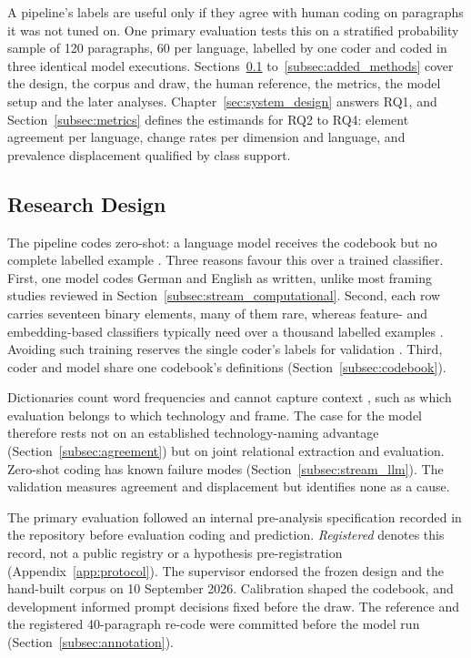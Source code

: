 A pipeline's labels are useful only if they agree with human coding on paragraphs it was not tuned on. One primary evaluation tests this on a stratified probability sample of 120 paragraphs, 60 per language, labelled by one coder and coded in three identical model executions. Sections~\ref{subsec:research_design} to~\ref{subsec:added_methods} cover the design, the corpus and draw, the human reference, the metrics, the model setup and the later analyses. Chapter~\ref{sec:system_design} answers RQ1, and Section~\ref{subsec:metrics} defines the estimands for RQ2 to RQ4: element agreement per language, change rates per dimension and language, and prevalence displacement qualified by class support.

\subsection{Research Design}\label{subsec:research_design}

The pipeline codes zero-shot: a language model receives the codebook but no complete labelled example \parencite[p.~104]{feuerriegel2025nlptextdata}. Three reasons favour this over a trained classifier. First, one model codes German and English as written, unlike most framing studies reviewed in Section~\ref{subsec:stream_computational}. Second, each row carries seventeen binary elements, many of them rare, whereas feature- and embedding-based classifiers typically need over a thousand labelled examples \parencite[p.~104]{feuerriegel2025nlptextdata}. Avoiding such training reserves the single coder's labels for validation \parencite[p.~259]{ziems2024css}. Third, coder and model share one codebook's definitions (Section~\ref{subsec:codebook}).

Dictionaries count word frequencies and cannot capture context \parencite[p.~103]{feuerriegel2025nlptextdata}, such as which evaluation belongs to which technology and frame. The case for the model therefore rests not on an established technology-naming advantage (Section~\ref{subsec:agreement}) but on joint relational extraction and evaluation. Zero-shot coding has known failure modes (Section~\ref{subsec:stream_llm}). The validation measures agreement and displacement but identifies none as a cause.

The primary evaluation followed an internal pre-analysis specification recorded in the repository before evaluation coding and prediction. \emph{Registered} denotes this record, not a public registry or a hypothesis pre-registration (Appendix~\ref{app:protocol}). The supervisor endorsed the frozen design and the hand-built corpus on 10 September 2026. Calibration shaped the codebook, and development informed prompt decisions fixed before the draw. The reference and the registered 40-paragraph re-code were committed before the model run (Section~\ref{subsec:annotation}).

